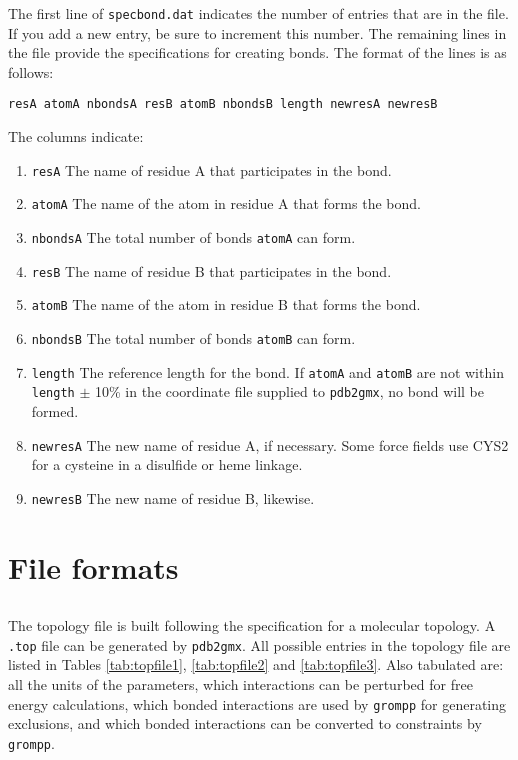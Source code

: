 The first line of {\tt specbond.dat} indicates the number of entries that are in the file. If you
add a new entry, be sure to increment this number. The remaining lines in the file provide the
specifications for creating bonds. The format of the lines is as follows:

{\tt resA  atomA  nbondsA  resB  atomB  nbondsB  length  newresA  newresB }

The columns indicate:
\begin{enumerate}
\item {\tt resA} The name of residue A that participates in the bond.
\item {\tt atomA} The name of the atom in residue A that forms the bond.
\item {\tt nbondsA} The total number of bonds {\tt atomA} can form.
\item {\tt resB} The name of residue B that participates in the bond.
\item {\tt atomB} The name of the atom in residue B that forms the bond.
\item {\tt nbondsB} The total number of bonds {\tt atomB} can form.
\item {\tt length} The reference length for the bond. If {\tt atomA} and {\tt atomB} are not within
{\tt length} $\pm$ 10\% in the coordinate file supplied to {\tt pdb2gmx}, no bond will be formed.
\item {\tt newresA} The new name of residue A, if necessary. Some force fields use {\eg} CYS2 for 
a cysteine in a disulfide or heme linkage.
\item {\tt newresB} The new name of residue B, likewise.
\end{enumerate}


\section{File formats}
\subsection{}
\label{subsec:topfile}
The topology file is built following the {\gromacs} specification for a
molecular topology.  A {\tt *.top} file can be generated by
{\tt pdb2gmx}.
All possible entries in the topology file are listed in
Tables \ref{tab:topfile1}, \ref{tab:topfile2}  and \ref{tab:topfile3}.
Also tabulated are: all the units
of the parameters, which interactions can be perturbed for free energy
calculations, which bonded interactions are used by {\tt grompp}
for generating exclusions, and which bonded interactions can be converted
to constraints by {\tt grompp}.

